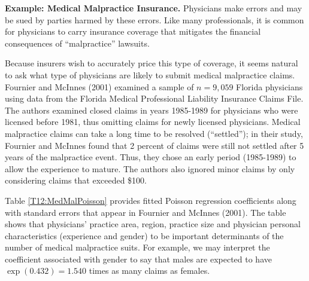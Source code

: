\linejed{}

\textbf{Example: Medical Malpractice Insurance.} Physicians make errors and may be sued by
parties harmed by these errors. Like many professionals, it is
common for physicians to carry insurance coverage that mitigates the
financial consequences of ``malpractice'' lawsuits.

Because insurers wish to accurately price this type of coverage, it
seems natural to ask what type of physicians are likely to submit
medical malpractice claims. Fournier and McInnes (2001) examined a
sample of $n=9,059$ Florida physicians using data from the Florida
Medical Professional Liability Insurance Claims File. The authors
examined closed claims in years 1985-1989 for physicians who were
licensed before 1981, thus omitting claims for newly licensed
physicians. Medical malpractice claims can take a long time to be
resolved (``settled''); in their study, Fournier and McInnes found
that 2 percent of claims were still not settled after 5 years of the
malpractice event. Thus, they chose an early period (1985-1989) to
allow the experience to mature. The authors also ignored minor
claims by only considering claims that exceeded \$100.

Table \ref{T12:MedMalPoisson} provides fitted Poisson regression
coefficients along with standard errors that appear in Fournier and
McInnes (2001). The table shows that physicians' practice area,
region, practice size and physician personal characteristics
(experience and gender) to be important determinants of the number
of medical malpractice suits. For example, we may interpret the
coefficient associated with gender to say that males are expected to
have $\exp (0.432)= 1.540$ times as many claims as females.

